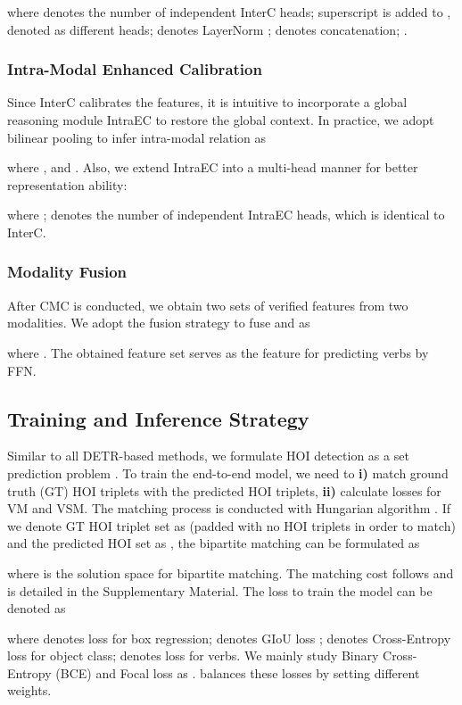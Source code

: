 \documentclass[letterpaper]{article} \usepackage{aaai22}  \usepackage{times}  \usepackage{helvet}  \usepackage{courier}  \usepackage[hyphens]{url}  \usepackage{graphicx} \urlstyle{rm} \def\UrlFont{\rm}  \usepackage{natbib}  \usepackage{caption} \DeclareCaptionStyle{ruled}{labelfont=normalfont,labelsep=colon,strut=off} \frenchspacing  \setlength{\pdfpagewidth}{8.5in}  \setlength{\pdfpageheight}{11in}  \usepackage{algorithm}
\begin{document}
where  denotes the number of independent InterC heads; superscript is added to , denoted as different heads;  denotes LayerNorm \cite{ba2016layernorm};  denotes concatenation; .


\subsubsection{Intra-Modal Enhanced Calibration} Since InterC calibrates the features, it is intuitive to incorporate a global reasoning module IntraEC to restore the global context. In practice, we adopt bilinear pooling \cite{kim2016hadamard,yuan2021learningcontext} to infer intra-modal relation as


where ,  and . Also, we extend IntraEC into a multi-head manner for better representation ability:

where ;  denotes the number of independent IntraEC heads, which is identical to InterC.


\subsubsection{Modality Fusion} After CMC is conducted, we obtain two sets of verified features from two modalities. We adopt the fusion strategy \cite{zhang2018learningtocount} to fuse  and  as  

where . The obtained feature set  serves as the feature for predicting verbs by FFN.

\subsection{Training and Inference Strategy} 
Similar to all DETR-based methods, we formulate HOI detection as a set prediction problem \cite{carion2020DETR}. To train the end-to-end model, we need to \textbf{i)} match ground truth (GT) HOI triplets with the predicted HOI triplets, \textbf{ii)} calculate losses for VM and VSM. The matching process is conducted with Hungarian algorithm \cite{kuhn1955hungarian}. If we denote GT HOI triplet set as  (padded with no HOI triplets in order to match) and the predicted HOI set as , the bipartite matching can be formulated as

where  is the solution space for bipartite matching. The matching cost  follows \cite{tamura2021qpic} and is detailed in the Supplementary Material. The loss to train the model can be denoted as

where  denotes  loss for box regression;  denotes GIoU loss \cite{rezatofighi2019GIoU};  denotes Cross-Entropy loss for object class;  denotes loss for verbs. We mainly study Binary Cross-Entropy (BCE) and Focal loss \cite{lin2017focal} as .  balances these losses by setting different weights.
\end{document}
